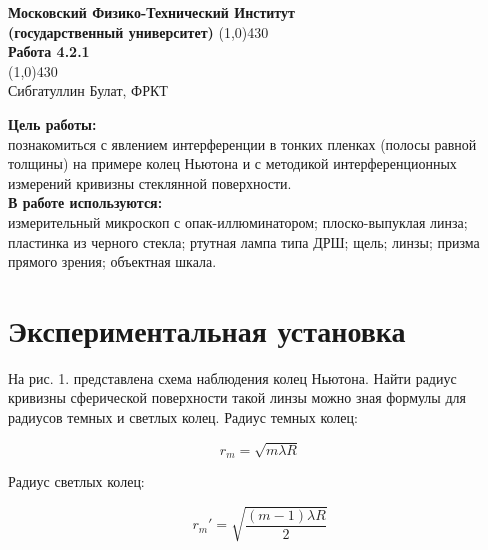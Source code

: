\documentclass[a4paper, 12pt]{article}%
\begin{document}
\begin{titlepage}

\begin{center}
\large\textbf{Московский Физико-Технический Институт}\\
\large\textbf{(государственный университет)}
\vfill
\line(1,0){430}\\[1mm]
\huge\textbf{Работа 4.2.1}\\
\line(1,0){430}\\[1mm]
\vfill
\large Сибгатуллин Булат, ФРКТ\\
\end{center}

\end{titlepage}
\noindent \textbf{Цель работы:} \\
\indent познакомиться с явлением интерференции в тонких пленках (полосы равной толщины) на примере колец Ньютона и с методикой интерференционных измерений кривизны стеклянной поверхности.\\
\noindent \textbf{В работе используются:} \\
\indent измерительный микроскоп с опак-иллюминатором; плоско-выпуклая линза; пластинка из черного стекла; ртутная лампа типа ДРШ; щель; линзы; призма прямого зрения; объектная шкала.

\section*{Экспериментальная установка}

На рис. 1. представлена схема наблюдения колец Ньютона. Найти радиус кривизны сферической поверхности такой линзы можно зная формулы для радиусов темных и светлых колец. Радиус темных колец:

\begin{equation} \label{bright}
r_m = \sqrt{m \lambda R}
\end{equation}

Радиус светлых колец:

\begin{equation}
r_m' = \sqrt{\frac{(m - 1) \lambda R}{2}}
\end{equation}
\end{document}
